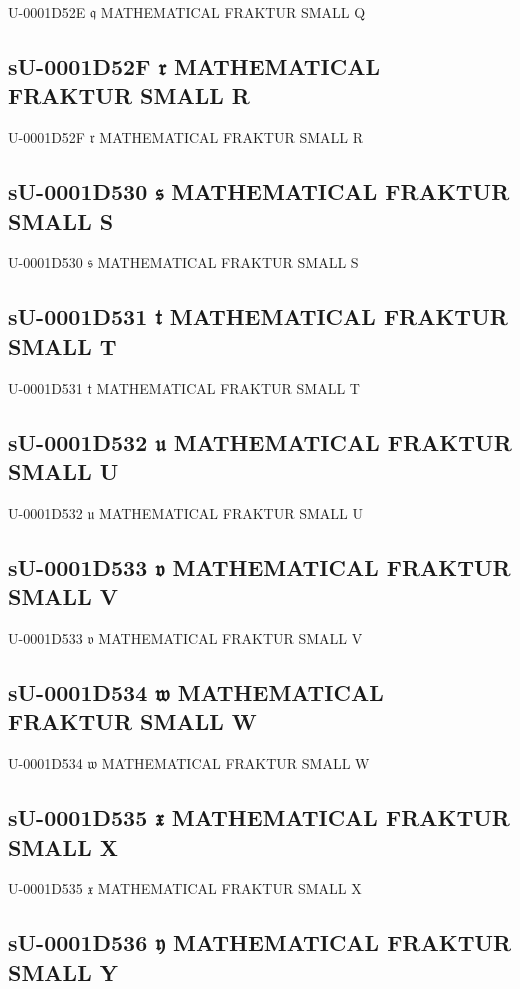 U-0001D52E 𝔮 MATHEMATICAL FRAKTUR SMALL Q

\subsection{sU-0001D52F 𝔯 MATHEMATICAL FRAKTUR SMALL R}

U-0001D52F 𝔯 MATHEMATICAL FRAKTUR SMALL R

\subsection{sU-0001D530 𝔰 MATHEMATICAL FRAKTUR SMALL S}

U-0001D530 𝔰 MATHEMATICAL FRAKTUR SMALL S

\subsection{sU-0001D531 𝔱 MATHEMATICAL FRAKTUR SMALL T}

U-0001D531 𝔱 MATHEMATICAL FRAKTUR SMALL T

\subsection{sU-0001D532 𝔲 MATHEMATICAL FRAKTUR SMALL U}

U-0001D532 𝔲 MATHEMATICAL FRAKTUR SMALL U

\subsection{sU-0001D533 𝔳 MATHEMATICAL FRAKTUR SMALL V}

U-0001D533 𝔳 MATHEMATICAL FRAKTUR SMALL V

\subsection{sU-0001D534 𝔴 MATHEMATICAL FRAKTUR SMALL W}

U-0001D534 𝔴 MATHEMATICAL FRAKTUR SMALL W

\subsection{sU-0001D535 𝔵 MATHEMATICAL FRAKTUR SMALL X}

U-0001D535 𝔵 MATHEMATICAL FRAKTUR SMALL X

\subsection{sU-0001D536 𝔶 MATHEMATICAL FRAKTUR SMALL Y}


